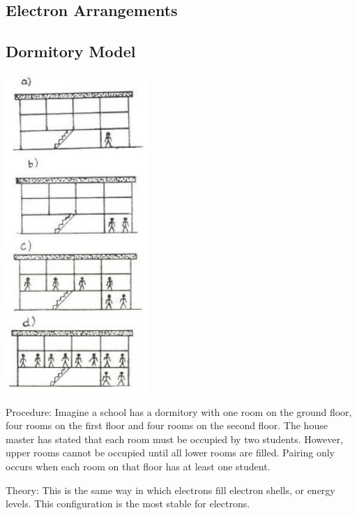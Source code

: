 \begin{multicols}{2}
\section*{Electron Arrangements} 


\subsection{Dormitory Model}

\begin{center}
\includegraphics[width=0.4\textwidth]{./img/source/dorm-arrangement.jpg}
\end{center}

\begin{description*}
\item[Procedure:]{Imagine a school has a dormitory with one room on the
ground floor, four rooms on the first floor and
four rooms on the second floor. The house
master has stated that each room must be occupied by two students. However, upper rooms cannot be occupied until all lower rooms are filled. Pairing only occurs when each room on that floor has at least one student.}
\item[Theory:]{This is the same way in which electrons fill electron shells, or energy levels. This configuration is the most stable for electrons.}
\end{description*}


\end{multicols}
